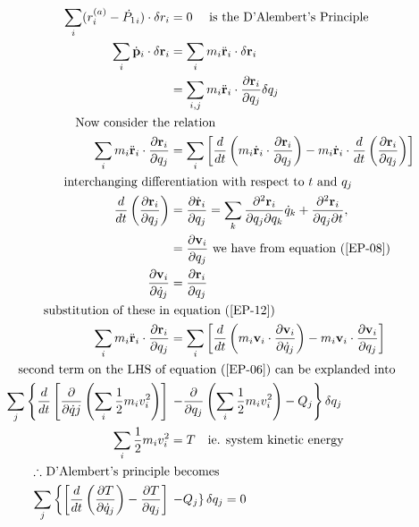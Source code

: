 \begin{align}
\sum\limits_{i}(r_i^{(a)}-\dot{P_1}_i)\cdot\delta r_i&=0\text{ \quad is the D'Alembert's Principle}\notag\\
\sum_{i} \dot{\mathbf{p}}_{i} \cdot \delta \mathbf{r}_{i}&=\sum_{i} m_{i} \ddot{\mathbf{r}}_{i} \cdot \delta \mathbf{r}_{i}\notag\\
&=\sum_{i, j} m_{i} \ddot{\mathbf{r}}_{i} \cdot \frac{\partial \mathbf{r}_{i}}{\partial q_{j}} \delta q_{j}\notag\\
\text{Now consider the}&\text{ relation}\notag\\
\sum_{i} m_{i} \ddot{\mathbf{r}}_{i} \cdot \frac{\partial \mathbf{r}_{i}}{\partial q_{j}}&=\sum_{i}\left[\frac{d}{d t}\left(m_{i} \dot{\mathbf{r}}_{i} \cdot \frac{\partial \mathbf{r}_{i}}{\partial q_{j}}\right)-m_{i} \dot{\mathbf{r}}_{i} \cdot \frac{d}{d t}\left(\frac{\partial \mathbf{r}_{i}}{\partial q_{j}}\right)\right]\label{EP-12}\\
\text{interchanging differ}&\text{entiation with respect to $t$ and $q_j$}\notag\\
 \frac{d}{d t}\left(\frac{\partial \mathbf{r}_{i}}{\partial q_{j}}\right) &=\frac{\partial \dot{\mathbf{r}}_{i}}{\partial q_{j}}=\sum_{k} \frac{\partial^{2} \mathbf{r}_{i}}{\partial q_{j} \partial q_{k}} \dot{q}_{k}+\frac{\partial^{2} \mathbf{r}_{i}}{\partial q_{j} \partial t}, \notag\\
&=\frac{\partial \mathbf{v}_{i}}{\partial q_{j}}
\text{ we have from equation }(\ref{EP-08})\notag\\
\frac{\partial \mathbf{v}_{i}}{\partial \dot{q}_{j}}&=\frac{\partial \mathbf{r}_{i}}{\partial q_{j}}\label{EP-13}\\
\text{substitution of these in}&\text{ equation (\ref{EP-12})}\notag\\
\sum_{i} m_{i} \ddot{\mathbf{r}}_{i} \cdot \frac{\partial \mathbf{r}_{i}}{\partial q_{j}}&=\sum_{i}\left[\frac{d}{d t}\left(m_{i} \mathbf{v}_{i} \cdot \frac{\partial \mathbf{v}_{i}}{\partial \dot{q}_{j}}\right)-m_{i} \mathbf{v}_{i} \cdot \frac{\partial \mathbf{v}_{i}}{\partial q_{j}}\right]\notag\\
\text{second term on the LHS of }&\text{equation (\ref{EP-06}) can be explanded into}\notag\\
\sum_{j}\left\{\frac{d}{d t}\left[\frac{\partial}{\partial \dot{q} j}\left(\sum_{i} \frac{1}{2} m_{i} v_{i}^{2}\right)\right]\right. &\left. -\frac{\partial}{\partial q_{j}}\left(\sum_{i} \frac{1}{2} m_{i} v_{i}^{2}\right)-Q_{j}\right\} \delta q_{j}\notag\\
\sum_{i} \frac{1}{2} m_{i} v_{i}^{2}&=T\quad \text{ie. system kinetic energy}\notag\\
\text{$\therefore$ D'Alembert's principle}&\text{ becomes }\notag\\
\sum_{j}\left\{\left[\frac{d}{d t}\left(\frac{\partial T}{\partial \dot{q}_{j}}\right)-\frac{\partial T}{\partial q_{j}}\right]\right.& \left. -Q_{j}\right\} \delta q_{j}=0\label{EP-14}
\end{align}
